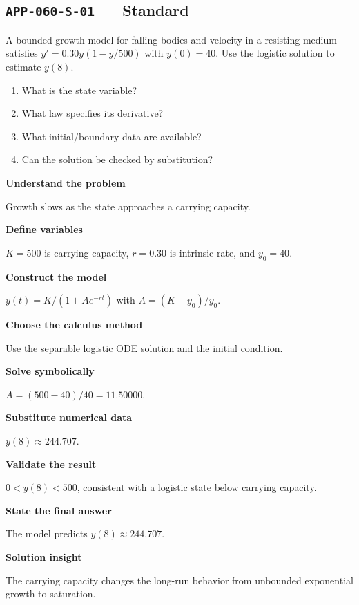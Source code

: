 \documentclass[11pt]{book}
\newcommand{\pid}[1]{\texttt{#1}}
\begin{document}
\subsection*{\pid{APP-060-S-01} — Standard}
\begin{problembox}
A bounded-growth model for falling bodies and velocity in a resisting medium satisfies $y'=0.30y(1-y/500)$ with $y(0)=40$. Use the logistic solution to estimate $y(8)$.
\end{problembox}
\begin{promptbox}\begin{enumerate}
\item What is the state variable?
\item What law specifies its derivative?
\item What initial/boundary data are available?
\item Can the solution be checked by substitution?
\end{enumerate}\end{promptbox}
\begin{solutionbox}
\textbf{Understand the problem}\par Growth slows as the state approaches a carrying capacity.\par\medskip
\textbf{Define variables}\par $K=500$ is carrying capacity, $r=0.30$ is intrinsic rate, and $y_0=40$.\par\medskip
\textbf{Construct the model}\par $y(t)=K/(1+A e^{-rt})$ with $A=(K-y_0)/y_0$.\par\medskip
\textbf{Choose the calculus method}\par Use the separable logistic ODE solution and the initial condition.\par\medskip
\textbf{Solve symbolically}\par $A=(500-40)/40=11.50000$.\par\medskip
\textbf{Substitute numerical data}\par $y(8)\approx 244.707$.\par\medskip
\textbf{Validate the result}\par $0<y(8)<500$, consistent with a logistic state below carrying capacity.\par\medskip
\textbf{State the final answer}\par The model predicts $y(8)\approx 244.707$.\par\medskip
\textbf{Solution insight}\par The carrying capacity changes the long-run behavior from unbounded exponential growth to saturation.\par\medskip
\end{solutionbox}
\end{document}
